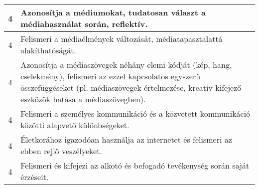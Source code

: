 \begin{longtable}{c | p{} }
                                
                                          4 &  Azonosítja a médiumokat, tudatosan választ a médiahasználat során, reflektív. \\ \hline
                                          4 &  Felismeri a médiaélmények változását, médiatapasztalattá alakíthatóságát. \\ \hline
                                          4 &  Azonosítja a médiaszövegek néhány elemi kódját (kép, hang, cselekmény), felismeri az ezzel kapcsolatos egyszerű összefüggéseket (pl. médiaszövegek értelmezése, kreatív kifejező eszközök hatása a médiaszövegben). \\ \hline
                                          4 &  Felismeri a személyes kommunikáció és a közvetett kommunikáció közötti alapvető különbségeket. \\ \hline
                                          4 &  Életkorához igazodóan használja az internetet és felismeri az ebben rejlő veszélyeket. \\ \hline
                                          4 &  Felismeri és kifejezi az alkotó és befogadó tevékenység során saját érzéseit. \\ \hline
                                      
                        \end{longtable}
            \clearpage

